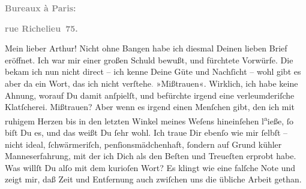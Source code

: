 \pstart
           \begin{otherlanguage}{french}\textcolor{gray}{\textbf{\textbf{Bureaux à Paris:}}}\end{otherlanguage}\pend
           
\pstart
           \begin{otherlanguage}{french}\textcolor{gray}{\textbf{\textbf{rue Richelieu 75.}}}\end{otherlanguage}\pend
           
\pstart\center{}Mein lieber Arthur!\pend\vspace{0.5em}
\pstart
           Nicht ohne Bangen habe ich diesmal Deinen lieben Brief eröffnet. Ich war mir einer
               großen Schuld bewußt, und fürchtete Vorwürfe. Die bekam ich nun nicht direct – ich
               kenne Deine Güte und Nachſicht – wohl gibt es aber da ein Wort, das ich nicht
                  verſtehe\textcolor{gray}{.} »Mißtrauen«. Wirklich, ich habe keine Ahnung, worauf
               Du damit anſpielſt, und befürchte irgend eine verleumderiſche Klatſcherei. Mißtrauen?
               Aber wenn es irgend einen Menſchen gibt, den ich mit ruhigem Herzen bis in den
               letzten Winkel meines Weſens hineinſehen l\substVorne{}\textsuperscript{a}\substDazwischen{}ie\substHinten{}ße, ſo {\pb}biſt Du es, und das weißt Du ſehr
               wohl. Ich traue Dir ebenſo wie mir ſelbſt – nicht ideal, ſchwärmeriſch,
               penſionsmädchenhaft, ſondern auf Grund kühler Manneserfahrung, mit der ich Dich als
               den Beſten und Treueſten erprobt habe. Was willſt Du alſo mit dem kurioſen Wort? Es
               klingt wie eine falſche Note und zeigt mir, daß Zeit und Entfernung auch zwiſchen uns
               die übliche Arbeit gethan.\pend
           
